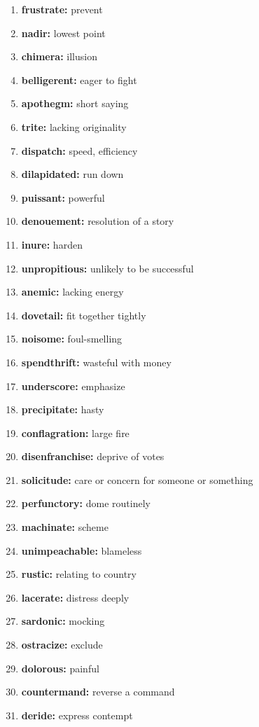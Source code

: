 \documentclass{article}
\begin{document}
\begin{enumerate}
    \item \textbf{frustrate: }{prevent}
    \item \textbf{nadir: }{lowest point}
    \item \textbf{chimera: }{illusion}
    \item \textbf{belligerent: }{eager to fight}
    \item \textbf{apothegm: }{short saying}
    \item \textbf{trite: }{lacking originality}
    \item \textbf{dispatch: }{speed, efficiency}
    \item \textbf{dilapidated: }{run down}
    \item \textbf{puissant: }{powerful}
    \item \textbf{denouement: }{resolution of a story}
    \item \textbf{inure: }{harden}
    \item \textbf{unpropitious: }{unlikely to be successful}
    \item \textbf{anemic: }{lacking energy}
    \item \textbf{dovetail: }{fit together tightly}
    \item \textbf{noisome: }{foul-smelling}
    \item \textbf{spendthrift: }{wasteful with money}
    \item \textbf{underscore: }{emphasize}
    \item \textbf{precipitate: }{hasty}
    \item \textbf{conflagration: }{large fire}
    \item \textbf{disenfranchise: }{deprive of votes}
    \item \textbf{solicitude: }{care or concern for someone or something}
    \item \textbf{perfunctory: }{dome routinely}
    \item \textbf{machinate: }{scheme}
    \item \textbf{unimpeachable: }{blameless}
    \item \textbf{rustic: }{relating to country}
    \item \textbf{lacerate: }{distress deeply}
    \item \textbf{sardonic: }{mocking}
    \item \textbf{ostracize: }{exclude}
    \item \textbf{dolorous: }{painful}
    \item \textbf{countermand: }{reverse a command}
    \item \textbf{deride: }{express contempt}

\end{enumerate}
\end{document}
